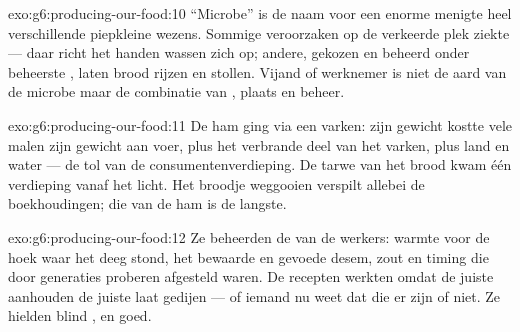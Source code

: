 \begin{solution}{exo:g6:producing-our-food:10}
``Microbe'' is de naam voor een enorme menigte heel verschillende
piepkleine wezens. Sommige veroorzaken op de verkeerde plek ziekte --- daar richt
het handen wassen zich op; andere, gekozen en beheerd onder beheerste
, laten brood rijzen en  stollen. Vijand of werknemer
is niet de aard van de microbe maar de combinatie van , plaats en
beheer.
\end{solution}

\begin{solution}{exo:g6:producing-our-food:11}
De ham ging via een varken: zijn gewicht kostte vele malen zijn gewicht
aan voer, plus het verbrande deel van het varken, plus land en water ---
de tol van de consumentenverdieping. De tarwe van het brood kwam één
verdieping vanaf het licht. Het broodje weggooien verspilt allebei de
boekhoudingen; die van de ham is de langste.
\end{solution}

\begin{solution}{exo:g6:producing-our-food:12}
Ze beheerden de \emph{} van de werkers: warmte voor de hoek
waar het deeg stond, het bewaarde en gevoede desem, zout en timing die
door generaties proberen afgesteld waren. De recepten werkten omdat de
juiste  aanhouden de juiste  laat gedijen ---
of iemand nu weet dat die  er zijn of niet. Ze hielden
blind , en goed.
\end{solution}

